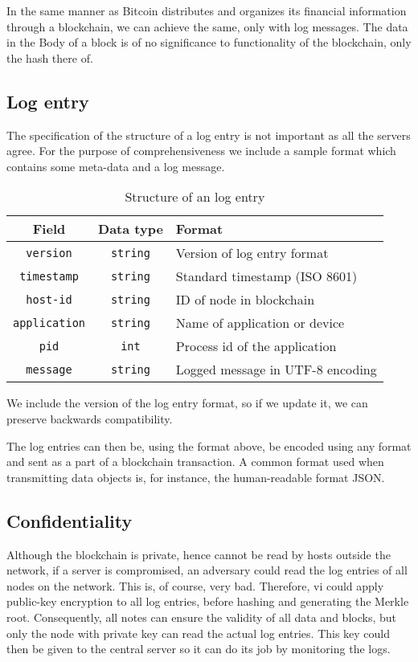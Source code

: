 
In the same manner as Bitcoin distributes and organizes its financial
information through a blockchain, we can achieve the same, only with
log messages. The data in the Body of a block is of no significance to
functionality of the blockchain, only the hash there of.



\subsection{Log entry}
The specification of the structure of a log entry is not important as
all the servers agree. For the purpose of comprehensiveness we include
a sample format which contains some meta-data and a log message.
\begin{table}[H]
  \centering
  \begin{tabular}{c|c|l}
    Field                & Data type       & Format                                    \\ \hline
    \texttt{version}     & \texttt{string} & Version of log entry format               \\
    \texttt{timestamp}   & \texttt{string} & Standard timestamp (ISO 8601)             \\
    \texttt{host-id}     & \texttt{string} & ID of node in blockchain                  \\
    \texttt{application} & \texttt{string} & Name of application or device             \\
    \texttt{pid}         & \texttt{int}    & Process id of the application             \\
    \texttt{message}     & \texttt{string} & Logged message in UTF-8 encoding
  \end{tabular}
  \caption{\label{tab:log-entry} Structure of an log entry}
\end{table}
We include the version of the log entry format, so if we update it, we
can preserve backwards compatibility.

The log entries can then be, using the format above, be encoded using
any format and sent as a part of a blockchain transaction. A common
format used when transmitting data objects is, for instance, the
human-readable format JSON.


\subsection{Confidentiality}
Although the blockchain is private, hence cannot be read by hosts
outside the network, if a server is compromised, an adversary could
read the log entries of all nodes on the network. This is, of course,
very bad. Therefore, vi could apply public-key encryption to all log
entries, before hashing and generating the Merkle root. Consequently,
all notes can ensure the validity of all data and blocks, but only the
node with private key can read the actual log entries. This key could
then be given to the central server so it can do its job by monitoring
the logs.

